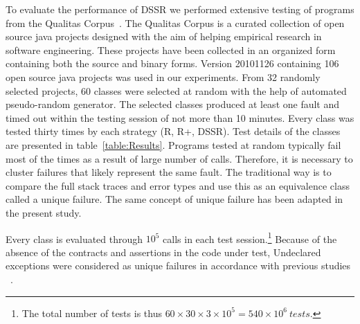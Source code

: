 \documentclass[conference]{IEEEtran}
\begin{document}
To evaluate the performance of DSSR we performed extensive testing of programs from the Qualitas Corpus~\cite{Tempero2010a}. The Qualitas Corpus is a curated collection of open source java projects designed with the aim of helping empirical research in  software engineering. These projects have been collected in an organized form containing both the source and binary forms. Version 20101126 containing 106 open source java projects was used in our experiments. From 32 randomly selected projects, 60 classes were selected at random with the help of automated pseudo-random generator. The selected classes produced at least one fault and timed out within the testing session of not more than 10 minutes. Every class was tested thirty times by each strategy (R, R+, DSSR). Test details of the classes are presented in table~\ref{table:Results}. Programs tested at random typically fail most of the times as a result of large number of calls. Therefore, it is necessary to cluster failures that likely represent the same fault. The traditional way is to compare the full stack traces and error types and use this as an equivalence class~\cite{Ciupa2007, Oriol2012} called a unique failure. The same concept of unique failure has been adapted in the present study.  

Every class is evaluated through $10^5$ calls in each test session.\footnote{The total number of tests is thus $60\times 30\times 3 \times 10^5 = 540\times 10^6~tests$.} 
Because of the absence of the contracts and assertions in the code under test, Undeclared exceptions were considered as unique failures in accordance with previous studies ~\cite{Oriol2012}.
\end{document}
